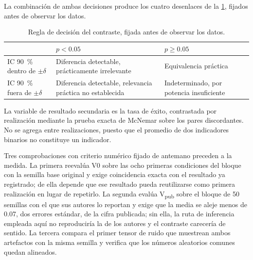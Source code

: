 La combinaci\'on de ambas decisiones produce los cuatro desenlaces de la
\cref{tab:regla-decision}, fijados antes de observar los datos.

\begin{table}[htbp]
  \centering
  \caption{Regla de decisi\'on del contraste, fijada antes de observar los datos.}
  \label{tab:regla-decision}
  \small
  \scriptsize
  \begin{tabular}{p{32mm} p{40mm} p{40mm}}
    \toprule
    & $p < \num{0.05}$ & $p \geq \num{0.05}$ \\
    \midrule
    IC \SI{90}{\percent} dentro de $\pm\delta$ & Diferencia detectable, pr\'acticamente
      irrelevante & Equivalencia pr\'actica \\
    IC \SI{90}{\percent} fuera de $\pm\delta$ & Diferencia detectable, relevancia
      pr\'actica no establecida & Indeterminado, por potencia insuficiente \\
    \bottomrule
  \end{tabular}
\end{table}

La variable de resultado secundaria es la tasa de \'exito, contrastada por realizaci\'on
mediante la prueba exacta de McNemar sobre los pares discordantes. No se agrega entre
realizaciones, puesto que el promedio de dos indicadores binarios no constituye un indicador.


Tres comprobaciones con criterio num\'erico fijado de antemano preceden a la medida. La
primera reeval\'ua V0 sobre las ocho primeras condiciones del bloque con la semilla base
original y exige coincidencia exacta con el resultado ya registrado; de ella depende que ese
resultado pueda reutilizarse como primera realizaci\'on en lugar de repetirlo. La segunda
eval\'ua V\textsubscript{pub} sobre el bloque de \num{50} semillas con el que sus autores lo
reportan y exige que la media se aleje menos de \num{0.07}, dos errores est\'andar, de la
cifra publicada; sin ella, la ruta de inferencia empleada aqu\'i no reproducir\'ia la de los
autores y el contraste carecer\'ia de sentido. La tercera compara el primer tensor de ruido
que muestrean ambos artefactos con la misma semilla y verifica que los n\'umeros aleatorios
comunes quedan alineados.

